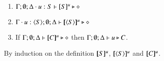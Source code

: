 \begin{proposition}\rm
\label{pro:characteristic}
\begin{enumerate}
\item $\Gamma; \emptyset; \Delta \cdot u:S \vdash [\!\![S]\!\!]^u \triangleright \diamond$ 
\item $\Gamma \cdot u:\langle S \rangle; \emptyset; \Delta \vdash [\!\![\langle S \rangle]\!\!]^u \triangleright \diamond$
\item 	If $\Gamma; \emptyset; \Delta \vdash [\!\![C]\!\!]^{u} \triangleright \diamond$
	then
	$\Gamma; \emptyset; \Delta \vdash u \triangleright C$.
\end{enumerate}
\end{proposition}
\begin{IEEEproof}
	By induction on the definition $[\!\![S]\!\!]^u$, $[\!\![\langle S \rangle]\!\!]^u$
and $[\!\![C]\!\!]^u$. 
\end{IEEEproof}



